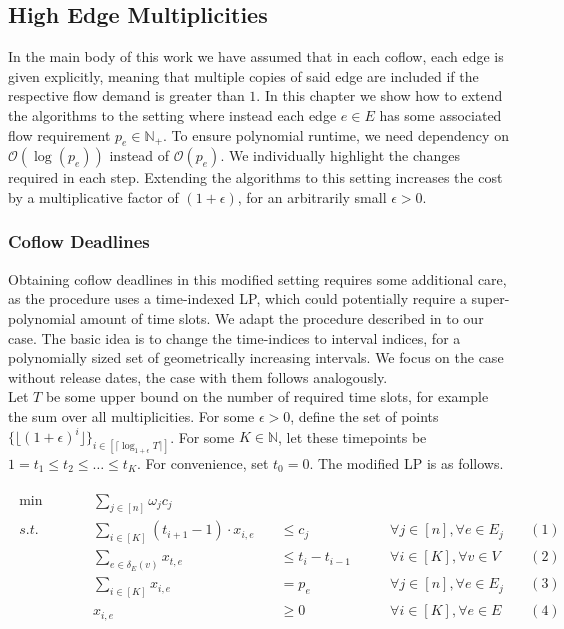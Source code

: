 \documentclass[11pt]{article}
\begin{document}
\subsection{High Edge Multiplicities}\label{sec:app:coflowpseudopoly}

In the main body of this work we have assumed that in each coflow, each edge is given explicitly, meaning that multiple copies of said edge are included if the respective flow demand is greater than $1$. In this chapter we show how to extend the algorithms to the setting where instead each edge $e\in E$ has some associated flow requirement $p_e \in \mathbb{N}_+$. To ensure polynomial runtime, we need dependency on $\mathcal{O}(\log(p_e))$ instead of $\mathcal{O}(p_e)$. We individually highlight the changes required in each step. Extending the algorithms to this setting increases the cost by a multiplicative factor of $(1+\epsilon)$, for an arbitrarily small $\epsilon > 0$.

\subsubsection*{Coflow Deadlines}

Obtaining coflow deadlines in this modified setting requires some additional care, as the procedure uses a time-indexed LP, which could potentially require a super-polynomial amount of time slots. We adapt the procedure described in \cite{im19} to our case. The basic idea is to change the time-indices to interval indices, for a polynomially sized set of geometrically increasing intervals. We focus on the case without release dates, the case with them follows analogously.\\

Let $T$ be some upper bound on the number of required time slots, for example the sum over all multiplicities. For some $\epsilon > 0$, define the set of points $\{\lfloor (1+\epsilon)^i\rfloor\}_{i \in [\lceil \log_{1+\epsilon}T\rceil]}$. For some $K \in \mathbb{N}$, let these timepoints be $1 = t_1 \le t_2 \le \dotsc \le t_K$. For convenience, set $t_0 = 0$. The modified LP is as follows.

\begin{gather*}\label{lp:deadlinespoly}\tag{LP D'}
\begin{aligned}
\min\qquad &&\sum_{j \in [n]} \omega_jc_j  &~&&~\\
s.t.\qquad &&\sum_{i \in [K]}(t_{i+1}-1)\cdot x_{i,e} &\quad\le c_j \qquad&\forall j \in [n], \forall e \in E_j&& (1)\\
~&&\sum_{e \in \delta_E(v)}x_{t,e} &\quad\le t_i - t_{i-1}\qquad &\forall i \in [K],\forall v \in V && (2)\\
~&&\sum_{i \in [K]} x_{i,e} &\quad= p_e\qquad &\forall j \in [n], \forall e \in E_j && (3)\\
~&&x_{i,e} &\quad\ge 0\qquad &\forall i \in [K], \forall e \in E && (4)
\end{aligned}
\end{gather*}
\end{document}
